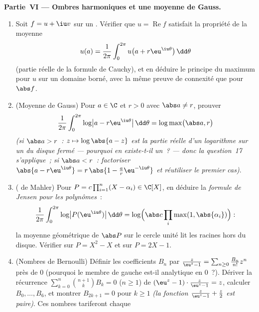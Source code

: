 \begin{problem}
\medskip
\noindent\textbf{Partie~VI --- Ombres harmoniques et une
moyenne de Gauss.}
\begin{enumerate}[resume]
  \item Soit $f = u + \iu v$  sur un .
        Vérifier que $u = \operatorname{Re}f$ satisfait la
        propriété de la moyenne
        \[
        u(a) = \frac1{2\pi}\int_0^{2\pi}
        u\bigl(a + r\eu^{\iu\theta}\bigr)\,\dd\theta
        \]
        (partie réelle de la formule de Cauchy), et en
        déduire le principe du maximum pour $u$ sur un
        domaine borné, avec la même preuve de connexité que
        pour $\abs f$.
  \item (Moyenne de Gauss) Pour $a \in \C$ et $r > 0$ avec
        $\abs a \neq r$, prouver
        \[
        \frac1{2\pi}\int_0^{2\pi}
        \log\bigl|a - r\eu^{\iu\theta}\bigr|\,\dd\theta
        = \log\max\bigl(\abs a, r\bigr)
        \]
        \emph{(si $\abs a > r$~: $z \mapsto \log\abs{a - z}$
        est la partie réelle d'un logarithme  sur
        un  du disque fermé --- pourquoi en
        existe-t-il un~? --- donc la question~17
        s'applique~; si $\abs a < r$~: factoriser $\abs{a -
        r\eu^{\iu\theta}} = r\,\abs{1 - \frac ar\eu^{-\iu
        \theta}}$ et réutiliser le premier cas)}.
  \item ( de Mahler) Pour $P = c\prod_{i=1}^n(X -
        \alpha_i) \in \C[X]$, en déduire la \emph{formule de
        Jensen pour les polynômes}~:
        \[
        \frac1{2\pi}\int_0^{2\pi}\log\bigl|P(\eu^{\iu\theta})
        \bigr|\,\dd\theta
        = \log\Bigl(\abs c\prod_{i}\max(1,
        \abs{\alpha_i})\Bigr) :
        \]
        la moyenne géométrique de $\abs P$ sur le cercle
        unité lit les racines hors du disque. Vérifier sur
        $P = X^2 - X$ et sur $P = 2X - 1$.
  \item (Nombres de Bernoulli) Définir les coefficients $B_n$
        par $\frac{z}{\eu^z - 1} = \sum_{n\geq0}\frac{B_n}{n!}
        z^n$ près de $0$ (pourquoi le membre de gauche est-il
        analytique en $0$~?). Dériver la récurrence
        $\sum_{k=0}^{n}\binom{n+1}kB_k = 0$ ($n \geq 1$) de
        $(\eu^z - 1)\cdot\frac z{\eu^z-1} = z$, calculer
        $B_0, \dots, B_6$, et montrer $B_{2k+1} = 0$ pour $k
        \geq 1$ \emph{(la fonction $\frac z{\eu^z-1} +
        \frac z2$ est paire)}. Ces nombres tariferont chaque

\end{enumerate}
\end{problem}
